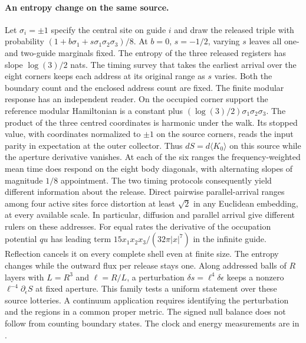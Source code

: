 \documentclass[11pt]{article}
\begin{document}
\paragraph{An entropy change on the same source.}
Let $\sigma_i=\pm1$ specify the central site on guide $i$ and draw
the released triple with probability
$(1+b\sigma_1+s\sigma_1\sigma_2\sigma_3)/8$.
At $b=0$, $s=-1/2$, varying $s$ leaves all one- and two-guide
marginals fixed. The entropy of the three released registers has slope
$\log(3)/2$ nats. The timing survey that takes the earliest arrival over
the eight corners keeps each address at its original range as $s$ varies.
Both the boundary count and the enclosed address count are fixed.
The finite modular response has an independent reader. On the occupied
corner support the reference modular Hamiltonian is a constant plus
$(\log(3)/2)\sigma_1\sigma_2\sigma_3$. The product of the three
centred coordinates is harmonic under the walk. Its stopped value,
with coordinates normalized to $\pm1$ on the source corners, reads the
input parity in expectation at the outer collector. Thus
$dS=d\langle K_0\rangle$ on this source while the aperture derivative
vanishes.
At each of the six ranges
the frequency-weighted mean time does respond on the eight body
diagonals, with alternating slopes of magnitude $1/8$ appointment.
The two timing protocols consequently yield different information
about the release. Direct pairwise parallel-arrival ranges among four active sites force
distortion at least $\sqrt{2}$ in any Euclidean embedding, at every
available scale. In particular, diffusion and parallel arrival give
different rulers on these addresses.
For equal rates the derivative of the occupation potential $q u$
has leading term $15x_1x_2x_3/(32\pi |x|^7)$ in the infinite guide.
Reflection cancels it on every complete shell even at finite size.
The entropy changes while the outward flux per release stays one.
Along addressed balls of $R$ layers with $L=R^3$ and $\ell=R/L$,
a perturbation $\delta s=\ell^4\delta\epsilon$ keeps a nonzero
$\ell^{-4}\partial_\epsilon S$ at fixed aperture. This family tests a
uniform statement over these source lotteries. A continuum application
requires identifying the perturbation and the regions in a common proper
metric. The signed null balance does not follow from counting boundary
states. The clock and energy measurements are in
.
\end{document}
